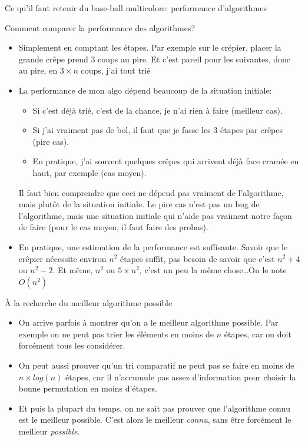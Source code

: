 \documentclass[final,hyperref={pdfpagelabels=false}]{beamer}
\begin{document}
\begin{frame}{Ce qu'il faut retenir du base-ball multicolore: performance d'algorithmes}
  \begin{block}{Comment comparer la performance des algorithmes?}
    \begin{itemize}
    \item Simplement en comptant les étapes. Par exemple sur le crépier, placer
      la grande crêpe prend 3 coups au pire. Et c'est pareil pour les
      suivantes, donc au pire, en $3\times n$ coups, j'ai tout trié
    \item La performance de mon algo dépend beaucoup de la situation initiale:
      \begin{itemize}
      \item Si c'est déjà trié, c'est de la chance, je n'ai rien à faire
        (\alert{meilleur cas}).
      \item Si j'ai vraiment pas de bol, il faut que je fasse les 3 étapes par
        crêpes (\alert{pire cas}).
      \item En pratique, j'ai souvent quelques crêpes qui arrivent déjà face
        cramée en haut, par exemple (\alert{cas moyen}).
      \end{itemize}
      Il faut bien comprendre que ceci ne dépend pas vraiment de l'algorithme,
      mais plutôt de la situation initiale. Le pire cas n'est pas un bug de
      l'algorithme, mais une situation initiale qui n'aide pas vraiment notre
      façon de faire (pour le cas moyen, il faut faire des probas).
    \item En pratique, une estimation de la performance est suffisante. Savoir
      que le crêpier nécessite environ $n^2$ étapes suffit, pas besoin de
      savoir que c'est $n^2+4$ ou $n^2-2$. Et même, $n^2$ ou $5\times
      n^2$, c'est un peu la même chose\ldots  On le note $O(n^2)$      
    \end{itemize}
  \end{block}

  \begin{block}{À la recherche du meilleur algorithme possible}
    \begin{itemize}
    \item On arrive parfois à montrer qu'on a le meilleur algorithme
      possible. Par exemple on ne peut pas trier les éléments en moins de $n$
      étapes, car on doit forcément tous les considérer.
    \item On peut aussi prouver qu'un tri comparatif ne peut pas se faire en
      moins de $n\times log(n)$ étapes, car il n'accumule pas assez
      d'information pour choisir la bonne permutation en moins d'étapes.
    \item Et puis la plupart du temps, on ne sait pas prouver que l'algorithme
      connu est le meilleur possible.  C'est alors le meilleur \textit{connu},
      sans être forcément le meilleur \textit{possible}.
    \end{itemize}
  \end{block}


\end{frame}
\end{document}
